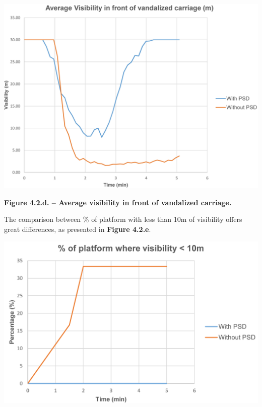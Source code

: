\documentclass{article}
\begin{document}
\begin{mdcenter}%

\noindent{}\includegraphics[keepaspectratio=true,width=\dimmin{}{\dimwidth{0.55}}]{images/Fig-4.2.d}{}%
\end{mdcenter}%

\begin{mdcenter}%

\noindent{}\textbf{Figure 4.2.d. – Average visibility in front of vandalized carriage.}%
\end{mdcenter}%

\noindent{}The comparison between \% of platform with less than 10m of visibility offers 
great differences, as presented in \textbf{Figure 4.2.e}.%

\begin{mdcenter}%

\noindent{}\includegraphics[keepaspectratio=true,width=\dimmin{}{\dimwidth{0.55}}]{images/Fig-4.2.e}{}%
\end{mdcenter}%
\end{document}
